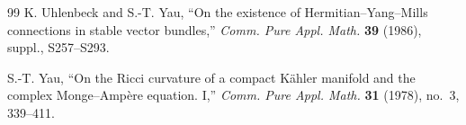 \documentclass[10pt, letterpaper]{amsart}
\theoremstyle{plain}
\theoremstyle{definition}
\numberwithin{equation}{section}
\begin{document}
\begin{thebibliography}{99}
 K. Uhlenbeck and S.-T. Yau,
``On the existence of Hermitian--Yang--Mills connections in stable vector
bundles,'' \emph{Comm. Pure Appl. Math.} \textbf{39} (1986), suppl.,
S257--S293.




 S.-T. Yau,
``On the Ricci curvature of a compact K\"ahler manifold and the complex
Monge--Amp\`ere equation. I,'' \emph{Comm. Pure Appl. Math.} \textbf{31}
(1978), no.~3, 339--411.
\end{thebibliography}
\end{document}
